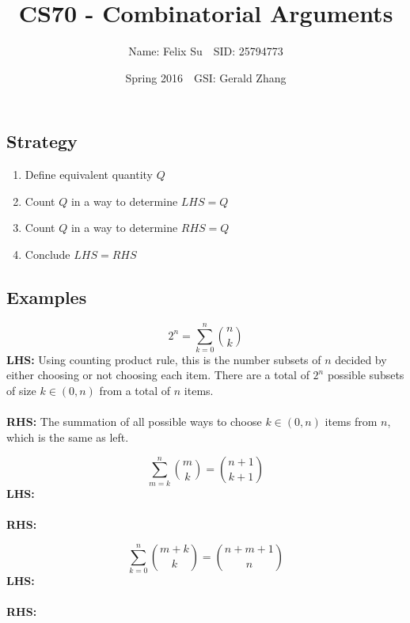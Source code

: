 \documentclass{article}\usepackage{amsmath,amssymb,amsthm,tikz,tkz-graph,color,chngpage,soul,hyperref,csquotes,graphicx,floatrow, listings}\newcommand*{\QEDB}{\hfill\ensuremath{\square}}\newtheorem*{prop}{Proposition}\renewcommand{\theenumi}{\alph{enumi}}\usepackage[shortlabels]{enumitem}\usepackage[nobreak=true]{mdframed}\usetikzlibrary{matrix,calc}\MakeOuterQuote{"}\usepackage[margin=0.75in]{geometry} \newtheorem{theorem}{Theorem}\newcommand{\Z}{\mathbb Z}\newcommand{\R}{\mathbb R}\newcommand{\Q}{\mathbb Q}\newcommand{\N}{\mathbb N}\newcommand{\x}[1]{\textrm{ #1 }}\newcommand{\pr}{\textrm{Pr}}
\title{CS70 - Combinatorial Arguments}
\author{Name: Felix Su$\quad$SID: 25794773}
\date{Spring 2016$\quad$GSI: Gerald Zhang}
\newcommand{\sumlim}[3]{\sum\limits_{#1}^{#2}#3}
\begin{document}
\maketitle

\subsection*{Strategy}
\begin{enumerate}[1.]
    \item Define equivalent quantity $Q$
    \item Count $Q$ in a way to determine $LHS=Q$
    \item Count $Q$ in a way to determine $RHS=Q$
    \item Conclude $LHS=RHS$
\end{enumerate}
\subsection*{Examples}
\begin{mdframed}
\begin{equation}2^n=\sumlim{k=0}{n}{\binom{n}{k}}\end{equation}
\textbf{LHS:} Using counting product rule, this is the number subsets of $n$ decided by either choosing or not choosing each item. There are a total of $2^n$ possible subsets of size $k \in (0,n)$ from a total of $n$ items.\\\\
\textbf{RHS:} The summation of all possible ways to choose $k \in (0,n)$ items from $n$, which is the same as left.
\end{mdframed}
\begin{mdframed}
\begin{equation}\sumlim{m=k}{n}{\binom{m}{k}}=\binom{n+1}{k+1}\end{equation}
\textbf{LHS:} \\\\
\textbf{RHS:} 
\end{mdframed}
\begin{mdframed}
\begin{equation}\sumlim{k=0}{n}{\binom{m+k}{k}}=\binom{n+m+1}{n}\end{equation}
\textbf{LHS:} \\\\
\textbf{RHS:} 
\end{mdframed}
\end{document}
